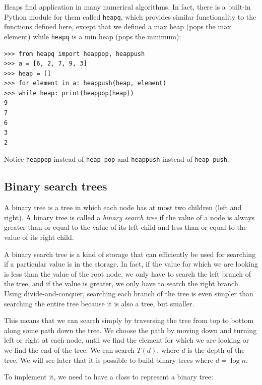 \documentclass[justified, sixbynine]{tufte-book}
\def\ft{\small\tt}
\theoremstyle{plain}%
\newtheorem * {corollary}{Corollary}
\theoremstyle{definition}
\theoremstyle{remark}
\newtheorem * {remark}{Remark}
\newtheorem * {note}{Note}
\begin{document}
\begin{fullwidth}
Heaps find application in many numerical algorithms. In fact, there is a built-in Python module for them called {\ft heapq}, which provides similar functionality to the functions defined here, except that we defined a max heap (pops the max element) while {\ft heapq} is a min heap (pops the minimum):

\begin{lstlisting}
>>> from heapq import heappop, heappush
>>> a = [6, 2, 7, 9, 3]
>>> heap = []
>>> for element in a: heappush(heap, element)
>>> while heap: print(heappop(heap))
9
7
6
3
2
\end{lstlisting}

Notice {\ft heappop} instead of {\ft heap\_pop} and {\ft heappush} instead of {\ft heap\_push}.

\subsection{Binary search trees}


A binary tree is a tree in which each node has at most two children (left and right). A binary tree is called a {\it binary search tree} if the value of a node is always greater than or equal to the value of its left child and less than or equal to the value of its right child.

A binary search tree is a kind of storage that can efficiently be used for searching if a particular value is in the storage. In fact, if the value for which we are looking is less than the value of the root node, we only have to search the left branch of the tree, and if the value is greater, we only have to search the right branch. Using divide-and-conquer, searching each branch of the tree is even simpler than searching the entire tree because it is also a tree, but smaller.

This means that we can search simply by traversing the tree from top to bottom along some path down the tree. We choose the path by moving down and turning left or right at each node, until we find the element for which we are looking or we find the end of the tree. We can search $T(d)$, where $d$ is the depth of the tree. We will see later that it is possible to build binary trees where $d=\log n$.

To implement it, we need to have a class to represent a binary tree:


\end{fullwidth}
\end{document}
